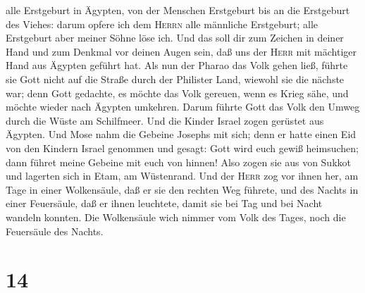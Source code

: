 alle Erstgeburt in Ägypten, von der Menschen Erstgeburt bis an die
Erstgeburt des Viehes: darum opfere ich dem \textsc{Herrn} alle
männliche Erstgeburt; alle Erstgeburt aber meiner Söhne löse ich.
 Und das soll dir zum Zeichen in deiner Hand und zum
Denkmal vor deinen Augen sein, daß uns der \textsc{Herr} mit mächtiger
Hand aus Ägypten geführt hat.  Als nun der Pharao das
Volk gehen ließ, führte sie Gott nicht auf die Straße durch der
Philister Land, wiewohl sie die nächste war; denn Gott gedachte, es
möchte das Volk gereuen, wenn es Krieg sähe, und möchte wieder nach
Ägypten umkehren.  Darum führte Gott das Volk den Umweg
durch die Wüste am Schilfmeer. Und die Kinder Israel zogen gerüstet aus
Ägypten.  Und Mose nahm die Gebeine Josephs mit sich;
denn er hatte einen Eid von den Kindern Israel genommen und gesagt: Gott
wird euch gewiß heimsuchen; dann führet meine Gebeine mit euch von
hinnen!  Also zogen sie aus von Sukkot und lagerten sich
in Etam, am Wüstenrand.  Und der \textsc{Herr} zog vor
ihnen her, am Tage in einer Wolkensäule, daß er sie den rechten Weg
führete, und des Nachts in einer Feuersäule, daß er ihnen leuchtete,
damit sie bei Tag und bei Nacht wandeln konnten.  Die
Wolkensäule wich nimmer vom Volk des Tages, noch die Feuersäule des
Nachts.

\hypertarget{section-13}{%
\section{14}\label{section-13}}

